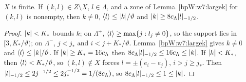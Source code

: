 \begin{lemma}[Dichotomy]\label{bpW:w7:dichotomy}
$X$ is finite. If $(k,l)\in Z\setminus X$, $l\in\Lambda$, and a zone of Lemma~\ref{bpW:w7:largek} for $(k,l)$ is
nonempty, then $k\ne0$, $\langle l\rangle\le\lvert k\rvert/\vartheta$ and $\lvert k\rvert\ge8c_\Lambda\lvert l\rvert_{-1/2}$.
\end{lemma}
\begin{proof}
\label{stepW:w7:Xfinite}
$\lvert k\rvert<K_*$ bounds $k$; on $\Lambda^+$, $\langle l\rangle\ge\max\{j:l_j\neq0\}$, so the support lies in $[3,K_*/\vartheta)$; on
$\Lambda^-$, $j<j_*$ and $i<j+K_*/\vartheta$.
\label{stepW:w7:dich-large}
Lemma~\ref{bpW:w7:largek} gives $k\ne0$ and $\langle l\rangle\le\lvert k\rvert/\vartheta$. If $\lvert k\rvert\ge K_*=16c_\Lambda$ then
$8c_\Lambda\lvert l\rvert_{-1/2}\le16c_\Lambda\le\lvert k\rvert$.
\label{stepW:w7:dich-small}
If $\lvert k\rvert<K_*$, then $\langle l\rangle<K_*/\vartheta$, so $(k,l)\notin X$ forces $l=\pm(e_i-e_j)$, $i>j\ge j_*$. Then
$\lvert l\rvert_{-1/2}\le2j^{-1/2}\le2j_*^{-1/2}=1/(8c_\Lambda)$, so $8c_\Lambda\lvert l\rvert_{-1/2}\le1\le\lvert k\rvert$.
\end{proof}

